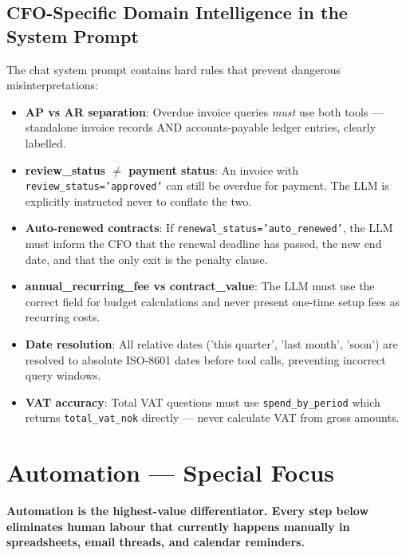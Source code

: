 \documentclass[12pt,a4paper]{article}
\newcommand{\keypoint}[1]{%
  \begin{tcolorbox}[colback=HighlightYellow, colframe=NordicGold,
    boxrule=1.2pt, arc=4pt, left=8pt, right=8pt, top=5pt, bottom=5pt]
    \faExclamationCircle\hspace{6pt}\textbf{#1}
  \end{tcolorbox}
}
\newcommand{\codeinline}[1]{\texttt{\small\color{NordicBlue}#1}}
\begin{document}
\vspace{0.8em}
\subsection{CFO-Specific Domain Intelligence in the System Prompt}

The chat system prompt contains hard rules that prevent dangerous misinterpretations:

\begin{itemize}[leftmargin=*]
  \item \textbf{AP vs AR separation}: Overdue invoice queries \emph{must} use both tools — standalone invoice records AND accounts-payable ledger entries, clearly labelled.
  \item \textbf{review\_status $\neq$ payment status}: An invoice with \codeinline{review\_status='approved'} can still be overdue for payment. The LLM is explicitly instructed never to conflate the two.
  \item \textbf{Auto-renewed contracts}: If \codeinline{renewal\_status='auto\_renewed'}, the LLM must inform the CFO that the renewal deadline has passed, the new end date, and that the only exit is the penalty clause.
  \item \textbf{annual\_recurring\_fee vs contract\_value}: The LLM must use the correct field for budget calculations and never present one-time setup fees as recurring costs.
  \item \textbf{Date resolution}: All relative dates ('this quarter', 'last month', 'soon') are resolved to absolute ISO-8601 dates before tool calls, preventing incorrect query windows.
  \item \textbf{VAT accuracy}: Total VAT questions must use \codeinline{spend\_by\_period} which returns \codeinline{total\_vat\_nok} directly — never calculate VAT from gross amounts.
\end{itemize}

\newpage

\section{Automation — Special Focus}

\keypoint{Automation is the highest-value differentiator. Every step below eliminates human labour that currently happens manually in spreadsheets, email threads, and calendar reminders.}
\end{document}
